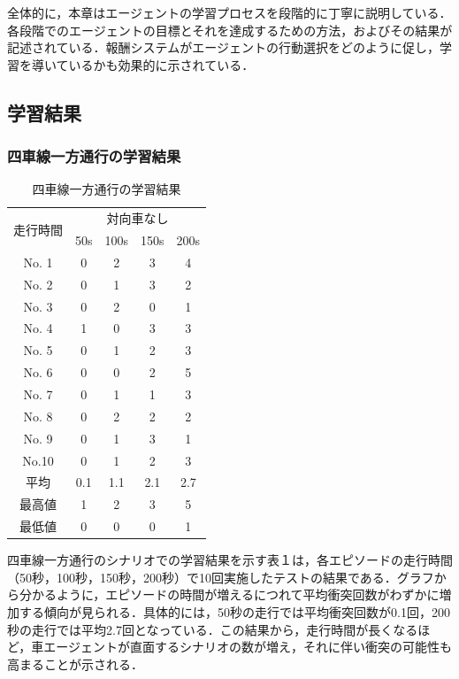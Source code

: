 全体的に，本章はエージェントの学習プロセスを段階的に丁寧に説明している．各段階でのエージェントの目標とそれを達成するための方法，およびその結果が記述されている．報酬システムがエージェントの行動選択をどのように促し，学習を導いているかも効果的に示されている．

\subsection{学習結果}
\subsubsection{四車線一方通行の学習結果}
\begin{table}[H]
\centering
\caption{四車線一方通行の学習結果}
\label{tab:ippoutuukou}
\begin{tabular}{|c|c|c|c|c|}
\hline
\multirow{2}{*}{走行時間} & \multicolumn{4}{c|}{対向車なし} \\ \cline{2-5} 
                           & 50s & 100s & 150s & 200s \\ \hline
No. 1                       & 0   & 2    & 3    & 4    \\ \hline
No. 2                       & 0   & 1    & 3    & 2    \\ \hline
No. 3                       & 0   & 2    & 0    & 1    \\ \hline
No. 4                       & 1   & 0    & 3    & 3    \\ \hline
No. 5                       & 0   & 1    & 2    & 3    \\ \hline
No. 6                       & 0   & 0    & 2    & 5    \\ \hline
No. 7                       & 0   & 1    & 1    & 3    \\ \hline
No. 8                       & 0   & 2    & 2    & 2    \\ \hline
No. 9                       & 0   & 1    & 3    & 1    \\ \hline
No.10                      & 0   & 1    & 2    & 3    \\ \hline
平均                       & 0.1 & 1.1  & 2.1  & 2.7  \\ \hline
最高値                     & 1   & 2    & 3    & 5    \\ \hline
最低値                     & 0   & 0    & 0    & 1    \\ \hline
\end{tabular}
\end{table}
四車線一方通行のシナリオでの学習結果を示す表１は，各エピソードの走行時間（50秒，100秒，150秒，200秒）で10回実施したテストの結果である．グラフから分かるように，エピソードの時間が増えるにつれて平均衝突回数がわずかに増加する傾向が見られる．具体的には，50秒の走行では平均衝突回数が0.1回，200秒の走行では平均2.7回となっている．この結果から，走行時間が長くなるほど，車エージェントが直面するシナリオの数が増え，それに伴い衝突の可能性も高まることが示される．

